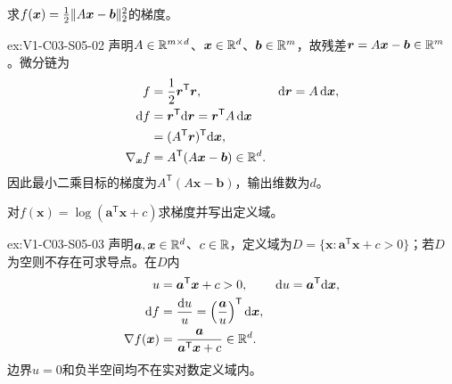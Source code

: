 \begin{SLChapterExercisePairSection}
\begin{exercise}[平方损失]\label{ex:V1-C03-S05-02}
求$f(\boldsymbol{x})=\frac12\lVert A\boldsymbol{x}-\boldsymbol b\rVert_2^2$的梯度。
\end{exercise}
\label{sol:V1-C03-S05-02}
\begin{chapterexercisesolution}{ex:V1-C03-S05-02}
声明$A\in\mathbb{R}^{m\times d}$、$\boldsymbol x\in\mathbb{R}^d$、$\boldsymbol b\in\mathbb{R}^m$，故残差$\boldsymbol r=A\boldsymbol x-\boldsymbol b\in\mathbb{R}^m$。微分链为
\[
\begin{aligned}
f&=\frac12\boldsymbol r^{\mathsf T}\boldsymbol r,
&\mathrm d\boldsymbol r&=A\,\mathrm d\boldsymbol x,\\
\mathrm df&=\boldsymbol r^{\mathsf T}\mathrm d\boldsymbol r
=\boldsymbol r^{\mathsf T}A\,\mathrm d\boldsymbol x\\
&=(A^{\mathsf T}\boldsymbol r)^{\mathsf T}\mathrm d\boldsymbol x,\\
\nabla_{\boldsymbol x}f
&=A^{\mathsf T}(A\boldsymbol x-\boldsymbol b)\in\mathbb{R}^d.
\end{aligned}
\]
因此最小二乘目标的梯度为$A^{\mathsf T}(A\boldsymbol x-\boldsymbol b)$，输出维数为$d$。
\end{chapterexercisesolution}

\begin{exercise}[仿射对数]\label{ex:V1-C03-S05-03}
对$f(\boldsymbol{x})=\log(\boldsymbol a^{\mathsf T}\boldsymbol x+c)$求梯度并写出定义域。
\end{exercise}
\label{sol:V1-C03-S05-03}
\begin{chapterexercisesolution}{ex:V1-C03-S05-03}
声明$\boldsymbol a,\boldsymbol x\in\mathbb{R}^d$、$c\in\mathbb{R}$，定义域为$D=\{\boldsymbol x:\boldsymbol a^{\mathsf T}\boldsymbol x+c>0\}$；若$D$为空则不存在可求导点。在$D$内
\[
\begin{aligned}
u&=\boldsymbol a^{\mathsf T}\boldsymbol x+c>0,
&\mathrm du&=\boldsymbol a^{\mathsf T}\mathrm d\boldsymbol x,\\
\mathrm df&=\frac{\mathrm du}{u}
=\left(\frac{\boldsymbol a}{u}\right)^{\mathsf T}\mathrm d\boldsymbol x,\\
\nabla f(\boldsymbol x)&=
\frac{\boldsymbol a}{\boldsymbol a^{\mathsf T}\boldsymbol x+c}\in\mathbb{R}^d.
\end{aligned}
\]
边界$u=0$和负半空间均不在实对数定义域内。
\end{chapterexercisesolution}


\end{SLChapterExercisePairSection}
